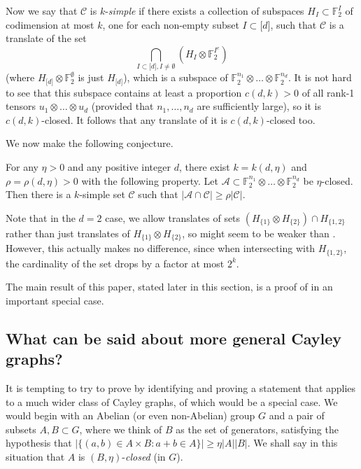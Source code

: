 \documentclass{toc}
\newcommand\F{\mathbb{F}}
\newcommand \cA{\mathcal A}
\newcommand \cC{\mathcal C}
\newcommand \s{\subset}
\begin{document}
Now we say that $\cC$ is $k$-\emph{simple} if there exists a collection of subspaces $H_I\s\F_2^I$ of codimension at most $k$, one for each non-empty subset  $I\s \lbrack d\rbrack$, such that $\cC$ is a translate of the set
\[
  \bigcap_{I\s \lbrack d\rbrack,I\neq \emptyset}(H_I\otimes \F_2^{I^c})
\]
(where $H_{\lbrack d \rbrack}\otimes \F_2^{\emptyset}$ is just
$H_{\lbrack d\rbrack}$), which is a subspace of
$\F_2^{n_1}\otimes \dots \otimes \F_2^{n_d}$. It is not hard to see
that this subspace contains at least a proportion $c(d,k)>0$ of all
rank-1 tensors $u_1\otimes \dots \otimes u_d$ (provided that
$n_1,\dots,n_d$ are sufficiently large), so it is $c(d,k)$-closed. It
follows that any translate of it is $c(d,k)$-closed too.

We now make the following conjecture.

\begin{conjecture} \label{mainconjecture}
	For any $\eta>0$ and any positive integer $d$, there exist $k=k(d,\eta)$ and $\rho=\rho(d,\eta)>0$ with the following property. Let $\cA\s \F_2^{n_1}\otimes \dots \otimes \F_2^{n_d}$ be $\eta$-closed. Then there is a $k$-simple set $\cC$ such that $|\cA\cap \cC|\geq \rho|\cC|$.
\end{conjecture}

\noindent Note that in the $d=2$ case, we allow translates of sets $(H_{\{1\}}\otimes H_{\{2\}})\cap H_{\{1,2\}}$ rather than just translates of $H_{\{1\}}\otimes H_{\{2\}}$, so  might seem to be weaker than . However, this actually makes no difference, since when intersecting with $H_{\{1,2\}}$, the cardinality of the set drops by a factor at most $2^k$.

The main result of this paper, stated later in this section, is a proof of  in an important special case. 

\subsection{What can be said about more general Cayley graphs?}

It is tempting to try to prove  by identifying and proving a statement that applies to a much wider class of Cayley graphs, of which  would be a special case. We would begin with an Abelian (or even non-Abelian) group $G$ and a pair of subsets $A,B\subset G$, where we think of $B$ as the set of generators, satisfying the hypothesis that $|\{(a,b)\in A\times B: a+b\in A\}|\geq\eta|A||B|$. We shall say in this situation that $A$ is $(B,\eta)$-\emph{closed} (in $G$).
\end{document}
